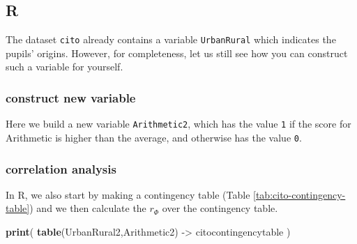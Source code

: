\documentclass[
]{book}
\newenvironment{Shaded}{\begin{snugshade}}{\end{snugshade}}
\newcommand{\CommentTok}[1]{\textcolor[rgb]{0.56,0.35,0.01}{\textit{#1}}}
\newcommand{\DecValTok}[1]{\textcolor[rgb]{0.00,0.00,0.81}{#1}}
\newcommand{\FunctionTok}[1]{\textcolor[rgb]{0.13,0.29,0.53}{\textbf{#1}}}
\newcommand{\NormalTok}[1]{#1}
\newcommand{\OtherTok}[1]{\textcolor[rgb]{0.56,0.35,0.01}{#1}}
\newcommand{\SpecialCharTok}[1]{\textcolor[rgb]{0.81,0.36,0.00}{\textbf{#1}}}
\begin{document}
\subsection{R}\label{r-10}

The dataset \texttt{cito} already contains a variable \texttt{UrbanRural} which indicates the pupils' origins.
However, for completeness, let us still see how you can construct such a variable for yourself.

\subsubsection{construct new variable}\label{construct-new-variable-2}

\begin{Shaded}
\end{Shaded}

Here we build a new variable \texttt{Arithmetic2}, which has the value \texttt{1} if the score for
Arithmetic is higher than the average, and otherwise has the value \texttt{0}.

\subsubsection{correlation analysis}\label{correlation-analysis-2}

In R, we also start by making a contingency table (Table \ref{tab:cito-contingency-table}) and we then calculate the \(r_\Phi\) over the contingency table.

\begin{Shaded}
\begin{Highlighting}[]
\FunctionTok{print}\NormalTok{( }\FunctionTok{table}\NormalTok{(UrbanRural2,Arithmetic2) }\OtherTok{{-}\textgreater{}}\NormalTok{ citocontingencytable ) }
\end{Highlighting}
\end{Shaded}
\end{document}
